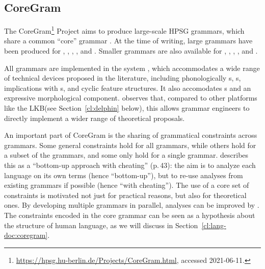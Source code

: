 \documentclass[output=paper
 	        ,biblatex
                ,babelshorthands
                ,newtxmath
                ,draftmode
                ,colorlinks, citecolor=brown
]{langscibook}
\begin{document}
\subsection{CoreGram}
\label{cl:coregram}

\largerpage
{}%
%
The CoreGram\footnote{
	\url{https://hpsg.hu-berlin.de/Projects/CoreGram.html}, accessed 2021-06-11.
} Project aims to produce large-scale HPSG grammars,
which share a common ``core'' grammar \citep{MuellerCoreGram}.
At the time of writing, large grammars have been produced for  \citep{MuellerLehrbuch1},
 \citep{MOeDanish},  \citep{MG2010a}, 
\citep{MuellerMalteseSketch}, and  \citep{ML2013a}.  Smaller grammars are also
available for , , , , and .

All grammars are implemented in the  system \citep{MPR2002a-u,Penn2004a-u}, which
accommodates a wide range of technical devices proposed in the literature, including phonologically
s, s, implications with s, and
cyclic feature structures.  It also accomodates s and an expressive morphological
component. \citet{MelnikHandWritten} observes that, compared to other platforms like
the LKB\indexlkb (see Section~\ref{cl:delphin} below), this allows grammar engineers to directly
implement a wider range of theoretical proposals.

An important part of CoreGram is the sharing of grammatical constraints across grammars.  Some
general constraints hold for all grammars, while others hold for a subset of the grammars, and some
only hold for a single grammar.  \citet{MuellerCoreGram} describes this as a
``bottom-up approach with cheating'' (p.\,43): the
aim is to analyze each language on its own terms (hence ``bottom-up''), but to re-use analyses from
existing grammars if possible (hence ``with cheating'').
The use of a core set of constraints is motivated not just for practical reasons,
but also for theoretical ones.  By developing multiple grammars in parallel, analyses can be
improved by .  The constraints encoded in the core grammar can be
seen as a hypothesis about the structure of human language,
as we will discuss in Section~\ref{cl:lang-doc:coregram}.
\end{document}
